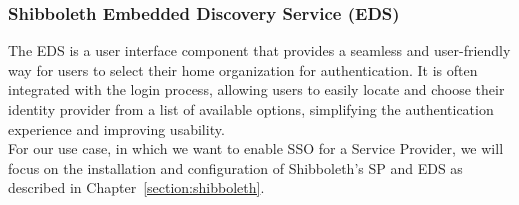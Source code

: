 \subsubsection*{Shibboleth Embedded Discovery Service (EDS)}
The EDS is a user interface component that provides a seamless and user-friendly
way for users to select their home organization for authentication. It is often
integrated with the login process, allowing users to easily locate and choose
their identity provider from a list of available options, simplifying the
authentication experience and improving usability. \\

For our use case, in which we want to enable SSO for a Service Provider, we will
focus on the installation and configuration of Shibboleth's SP and EDS as
described in Chapter~\ref{section:shibboleth}.



